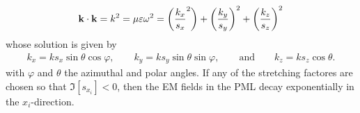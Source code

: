     \begin{align}
        \vb{k} \cdot \vb{k}  = k^2 = \mu\varepsilon\omega^2 =
            \qty(\frac{k_x}{s_x}^2 )+ \qty(\frac{k_y}{s_y})^2 + \qty(\frac{k_z}{s_z})^2
     \label{eq:k-reldisp}
    \end{align}
    whose solution is given by \cite{jin_theory_2010,chew_complex_1997}
    \begin{align}
        k_x = k s_x \sin\theta\cos\varphi, \qquad
            k_y = k s_y \sin\theta\sin\varphi, \qquad \text{and}\qquad
                k_z = k s_z \cos\theta.
     \label{eq:kstretchcomp}
    \end{align}
    with $\varphi$ and $\theta$ the azimuthal and polar angles. If any of the stretching factores are chosen so that $\Im[s_{x_i}]<0$, then the EM fields in the PML decay exponentially in the $x_i$-direction.

